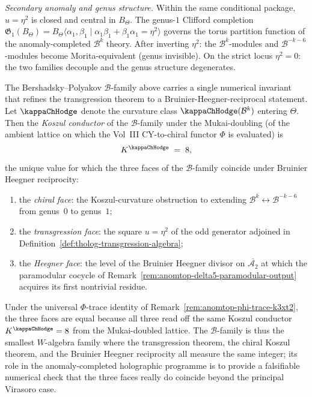 \begin{computation}
\emph{Secondary anomaly and genus structure.}
Within the same conditional package,
$u=\eta^2$ is closed and central in $B_\Theta$. The
genus-$1$ Clifford completion
$\mathfrak G_1(B_\Theta)=B_\Theta\langle\alpha_1,\beta_1
\mid\alpha_1\beta_1+\beta_1\alpha_1=\eta^2\rangle$
governs the torus partition function of the anomaly-completed
$\mathcal B^k$ theory. After inverting $\eta^2$:
the $\mathcal B^k$-modules and $\mathcal B^{-k-6}$-modules
become Morita-equivalent (genus invisible). On the strict
locus $\eta^2=0$: the two families decouple and the genus
structure degenerates.
\end{computation}

\begin{remark}[Mukai-doubling Koszul conductor $K^{\kappaChHodge}=8$ on the $\mathcal B$-family]
\label{rem:anomtop-mukai-koszul-conductor-8}
The Bershadsky--Polyakov $\mathcal B$-family above carries a
single numerical invariant that refines the transgression
theorem to a Bruinier-Heegner-reciprocal statement. Let
$\kappaChHodge$ denote the curvature class
$\kappaChHodge(\mathcal B^{k})$ entering $\Theta$. Then the
\emph{Koszul conductor} of the $\mathcal B$-family under the
Mukai-doubling (of the ambient lattice on which the
Vol~III CY-to-chiral functor $\Phi$ is evaluated) is
\[
K^{\kappaChHodge}
\;=\;
8,
\]
the unique value for which the three faces of the
$\mathcal B$-family coincide under Bruinier Heegner
reciprocity:
\begin{enumerate}[label=\textup{(\roman*)}]
\item the \emph{chiral face}: the Koszul-curvature obstruction to
extending $\mathcal B^{k}\leftrightarrow\mathcal B^{-k-6}$ from
genus~$0$ to genus~$1$;
\item the \emph{transgression face}: the square
$u=\eta^{2}$ of the odd generator adjoined in
Definition~\ref{def:tholog-transgression-algebra};
\item the \emph{Heegner face}: the level of the Bruinier
Heegner divisor on $\overline{\mathcal A_{2}}$ at which the
paramodular cocycle of
Remark~\ref{rem:anomtop-delta5-paramodular-output}
acquires its first nontrivial residue.
\end{enumerate}
Under the universal $\Phi$-trace identity of
Remark~\ref{rem:anomtop-phi-trace-k3xt2}, the three faces
are equal because all three read off the same Koszul
conductor $K^{\kappaChHodge}=8$ from the
Mukai-doubled lattice. The $\mathcal B$-family is thus the
smallest $W$-algebra family where the transgression theorem,
the chiral Koszul theorem, and the Bruinier Heegner
reciprocity all measure the same integer; its role in the
anomaly-completed holographic programme is to provide a
falsifiable numerical check that the three faces really do
coincide beyond the principal Virasoro case.
\end{remark}


